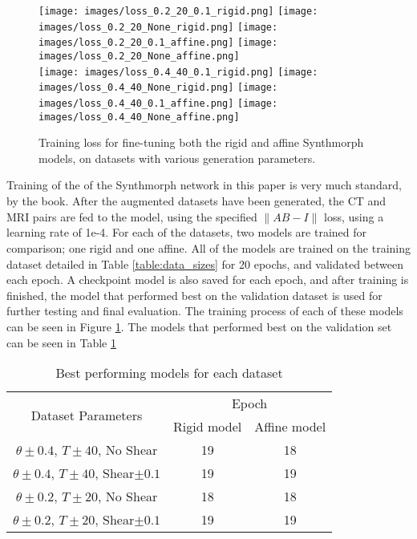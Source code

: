 \begin{figure}
\centering
\captionsetup{justification=centering}
\texttt{[image: images/loss\_0.2\_20\_0.1\_rigid.png]}
\texttt{[image: images/loss\_0.2\_20\_None\_rigid.png]}
\texttt{[image: images/loss\_0.2\_20\_0.1\_affine.png]}
\texttt{[image: images/loss\_0.2\_20\_None\_affine.png]}
\\
\texttt{[image: images/loss\_0.4\_40\_0.1\_rigid.png]}
\texttt{[image: images/loss\_0.4\_40\_None\_rigid.png]}
\texttt{[image: images/loss\_0.4\_40\_0.1\_affine.png]}
\texttt{[image: images/loss\_0.4\_40\_None\_affine.png]}
\caption{Training loss for fine-tuning both the rigid and affine Synthmorph models, on datasets with various generation parameters.}\label{fig:training_loss}
\end{figure}

Training of the of the Synthmorph network in this paper is very much standard, by the book. After the augmented datasets have been generated, the CT and MRI pairs are fed to the model, using the specified $\|A\hat{B} - I\|$ loss, using a learning rate of 1e-4. For each of the datasets, two models are trained for comparison; one rigid and one affine. All of the models are trained on the training dataset detailed in Table \ref{table:data_sizes} for 20 epochs, and validated between each epoch. A checkpoint model is also saved for each epoch, and after training is finished, the model that performed best on the validation dataset is used for further testing and final evaluation. The training process of each of these models can be seen in Figure \ref{fig:training_loss}. The models that performed best on the validation set can be seen in Table \ref{table:chosen_models}

\begin{table}[h!]
  \centering
  \begin{tabular}{c|cc}

    \multirow{2}{*}{Dataset Parameters}         & \multicolumn{2}{|c}{Epoch} \\\cline{2-3}
                                                & Rigid model & Affine model \\\hline
    $\theta \pm 0.4$, $T \pm 40$, No Shear      & 19          & 18           \\
    $\theta \pm 0.4$, $T \pm 40$, Shear$\pm0.1$ & 19          & 19           \\
    $\theta \pm 0.2$, $T \pm 20$, No Shear      & 18          & 18           \\
    $\theta \pm 0.2$, $T \pm 20$, Shear$\pm0.1$ & 19          & 19           \\\hline
  \end{tabular}
  \caption{Best performing models for each dataset}
  \label{table:chosen_models}
\end{table}

